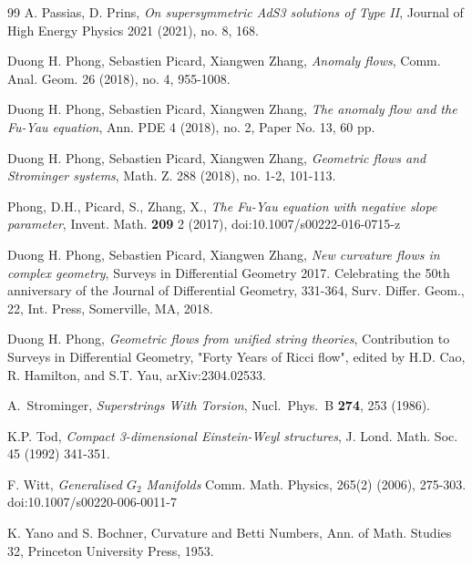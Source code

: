 \documentclass[10pt,british]{article}
\begin{document}
\begin{thebibliography}{99}
  A. Passias, D. Prins, \emph{On supersymmetric AdS3 solutions of Type II}, Journal of High Energy Physics 2021 (2021), no. 8, 168.


   Duong H. Phong, Sebastien Picard, Xiangwen Zhang,
\emph{Anomaly flows},  Comm. Anal. Geom. 26 (2018), no. 4, 955-1008.%

  Duong H. Phong, Sebastien Picard, Xiangwen Zhang, \emph{The
anomaly flow and the Fu-Yau equation},  Ann. PDE 4 (2018), no. 2, Paper No. 13, 60 pp.%

  Duong H. Phong, Sebastien Picard, Xiangwen Zhang,
\emph{Geometric flows and Strominger systems}, Math. Z. 288 (2018), no. 1-2, 101-113.%

 Phong, D.H., Picard, S., Zhang, X., \emph{The Fu-Yau equation with negative slope parameter},
Invent. Math.  \textbf{209} 2 (2017), doi:10.1007/s00222-016-0715-z


  Duong H. Phong, Sebastien Picard, Xiangwen Zhang, \emph{New curvature flows in complex geometry},  Surveys in Differential Geometry 2017. Celebrating the 50th anniversary of the Journal of Differential Geometry, 331-364, Surv. Differ.
Geom., 22, Int. Press, Somerville, MA, 2018. %

Duong H. Phong, \emph{Geometric flows from unified string theories},  Contribution to Surveys in Differential Geometry, "Forty Years of Ricci flow", edited by H.D. Cao, R. Hamilton, and S.T. Yau, arXiv:2304.02533.

A.~Strominger, \emph{Superstrings With Torsion},
Nucl.\ Phys.\ B {\bf 274}, 253 (1986).

 K.P. Tod, \emph{Compact 3-dimensional Einstein-Weyl structures}, J. Lond. Math. Soc. 45 (1992) 341-351.



 F. Witt, \emph{Generalised $G_2$ Manifolds} Comm.  Math. Physics, 265(2) (2006), 275-303. doi:10.1007/s00220-006-0011-7 

 K. Yano and S. Bochner, Curvature and Betti Numbers, Ann. of Math. Studies 32, Princeton University Press, 1953.




\end{thebibliography}
\end{document}
